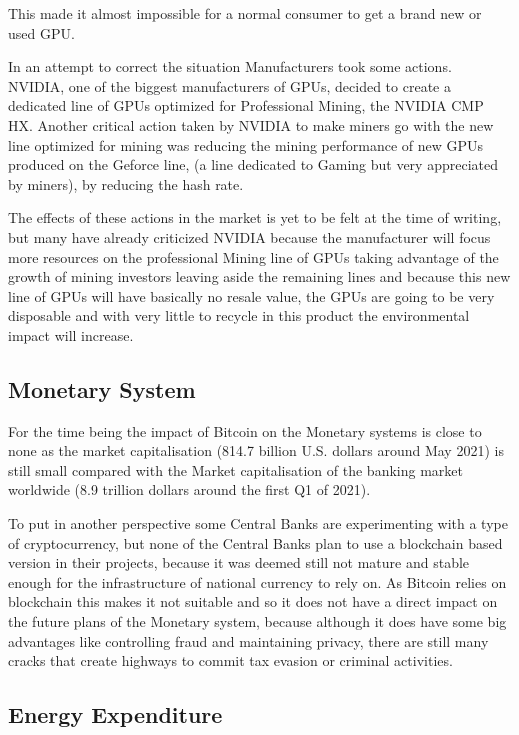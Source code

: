 \documentclass{article}
\newcommand\tab[1][1cm]{\hspace*{#1}}
\begin{document}
This made it almost impossible for a normal consumer to get a brand new or used GPU.

In an attempt to correct the situation Manufacturers took some actions. NVIDIA, one of the biggest manufacturers of GPUs, decided to create a dedicated line of GPUs optimized for Professional Mining, the NVIDIA CMP HX. Another critical action taken by NVIDIA to make miners go with the new line optimized for mining was reducing the mining performance of new GPUs produced on the Geforce line, (a line dedicated to Gaming but very appreciated by miners), by reducing the hash rate. 

The effects of these actions in the market is yet to be felt at the time of writing, but many have already criticized NVIDIA because the manufacturer will focus more resources on the professional Mining line of GPUs taking advantage of the growth of mining investors  leaving aside the remaining lines and because this new line of GPUs will have basically no resale value, the GPUs are going to be very disposable and with very little to recycle in this product the environmental impact will increase.

\subsection{Monetary System}

\tab For the time being the impact of Bitcoin on the Monetary systems is close to none as the market capitalisation (814.7 billion U.S. dollars around May 2021) is still small compared with the Market capitalisation of the banking market worldwide (8.9 trillion dollars around the first Q1 of 2021).

To put in another perspective some Central Banks are experimenting with a type of cryptocurrency, but none of the Central Banks plan to use a blockchain based version in their projects, because it was deemed still not mature and stable enough for the infrastructure of national currency to rely on. As Bitcoin relies on blockchain this makes it not suitable and so it does not have a direct impact on the future plans of the Monetary system, because although it does have some big advantages like controlling fraud and maintaining privacy, there are still many cracks that create highways to commit tax evasion or criminal activities.

\subsection{Energy Expenditure}
\end{document}
